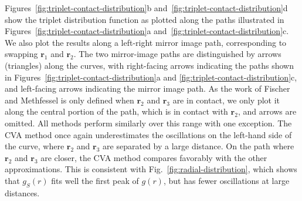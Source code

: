 \documentclass[letterpaper,twocolumn,amsmath,amssymb,pre,aps,10pt]{revtex4-1}
\newcommand{\rr}{\textbf{r}}
\begin{document}
Figures~\ref{fig:triplet-contact-distribution}b
and~\ref{fig:triplet-contact-distribution}d show the triplet
distribution function as plotted along the paths illustrated in
Figures~\ref{fig:triplet-contact-distribution}a
and~\ref{fig:triplet-contact-distribution}c.  We also plot the
results along a left-right mirror image path, corresponding to
swapping $\rr_1$ and $\rr_2$. The two mirror-image paths are
distinguished by arrows (triangles) along the curves, with right-facing arrows
indicating the paths shown in
Figures~\ref{fig:triplet-contact-distribution}a and
\ref{fig:triplet-contact-distribution}c, and left-facing arrows
indicating the mirror image path.  As the work of
Fischer and Methfessel is only defined when $\rr_2$ and $\rr_3$ are in
contact, we only plot it along the
central portion of the path, which is in contact with $\rr_2$, and arrows
are omitted.
%
All methods perform similarly over this range with one exception.  The
CVA method once again underestimates the oscillations on the left-hand
side of the curve, where $\rr_2$ and $\rr_3$ are separated by a large
distance.  On the path where $\rr_2$ and $\rr_3$ are closer, the CVA
method compares favorably with the other approximations.  This is
consistent with Fig.~\ref{fig:radial-distribution}, which shows that
$g_S(r)$ fits well the first peak of $g(r)$, but has fewer
oscillations at large distances.


\end{document}

